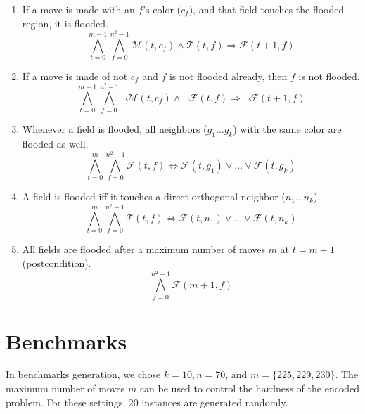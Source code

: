 \documentclass[conference]{IEEEtran}
\newcommand{\nMoves}{\ensuremath{m}\xspace}
\newcommand{\bSize}{\ensuremath{n}\xspace}
\newcommand{\clr}{\ensuremath{c}\xspace}
\newcommand{\nColors}{\ensuremath{k}\xspace}
\newcommand{\flood}[2]{\ensuremath{\mathcal{F}(#1,#2)}\xspace}
\newcommand{\move}[2]{\ensuremath{\mathcal{M}(#1,#2)}\xspace}
\newcommand{\touch}[2]{\ensuremath{\mathcal{T}(#1,#2)}\xspace}
\newcommand{\turn}{\ensuremath{t}\xspace}
\newcommand{\field}{\ensuremath{f}\xspace}
\begin{document}
\begin{enumerate}
	\item If a move is made with an \field's color ($\clr_\field$), and that field touches the flooded region, it is flooded.
	\begin{equation}
	\bigwedge_{\turn=0}^{\nMoves-1}
	\bigwedge_{\field=0}^{{\bSize^2}-1}
	\move{\turn}{\clr_\field}\wedge\touch{\turn}{\field}\Rightarrow\flood{\turn+1}{\field}
	\end{equation}
	\item If a move is made of not  $\clr_\field$ and \field is not flooded already, then \field is not flooded.
	\begin{equation}
	\bigwedge_{\turn=0}^{\nMoves-1}
	\bigwedge_{\field=0}^{{\bSize^2}-1}
	\neg\move{\turn}{\clr_\field}\wedge\neg\flood{\turn}{\field}\Rightarrow\neg\flood{\turn+1}{\field}
	\end{equation}
	\item Whenever a field is flooded, all neighbors ($g_1\dots g_k$) with the same color are flooded as well.
	\begin{equation}
	\bigwedge_{\turn=0}^{\nMoves}
	\bigwedge_{\field=0}^{{\bSize^2}-1}
	\flood{\turn}{\field}\Leftrightarrow\flood{\turn}{g_1}\vee\dots\vee\flood{\turn}{g_k}
	\end{equation} 
	\item A field is flooded iff it touches a direct orthogonal neighbor ($\bSize_1\dots \bSize_k$).
	\begin{equation}
	\bigwedge_{\turn=0}^{\nMoves}
	\bigwedge_{\field=0}^{{\bSize^2}-1}
	\touch{\turn}{\field}\Leftrightarrow\flood{\turn}{n_1}\vee\dots\vee\flood{\turn}{n_k}
	\end{equation} 
	\item All fields are flooded after a maximum number of moves \nMoves at $\turn=\nMoves+1$ (postcondition).
	\begin{equation}
	\bigwedge_{\field=0}^{{\bSize^2}-1}
	\flood{\nMoves+1}{\field}
	\end{equation} 
\end{enumerate}
\section{Benchmarks}
In benchmarks generation, we chose $\nColors=10, n=70$, and $m=\{225,229,230\}$. The maximum number of moves \nMoves can be used to control the hardness of the encoded problem. For these settings, 20 instances are generated randomly.


\end{document}
